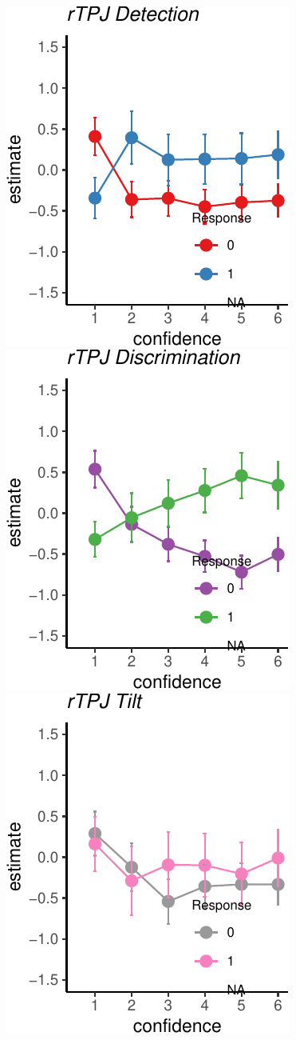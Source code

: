 \documentclass[]{article}
\begin{document}
~

\includegraphics{Chudi-Thesis_files/figure-latex/mixed_effects-1.pdf}
\includegraphics{Chudi-Thesis_files/figure-latex/mixed_effects-2.pdf}
\includegraphics{Chudi-Thesis_files/figure-latex/mixed_effects-3.pdf}
\end{document}
